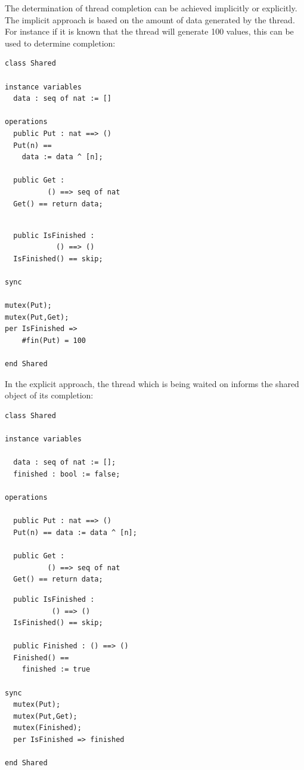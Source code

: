 \documentclass{overturerepchap}
\begin{document}
The determination of thread completion can be achieved implicitly or
explicitly. The implicit approach is based on the amount of data
generated by the thread. For instance if it is known that the thread
will generate 100 values, this can be used to determine completion:

\begin{multicols}{2}
\begin{lstlisting}
class Shared

instance variables
  data : seq of nat := []

operations
  public Put : nat ==> ()
  Put(n) ==
    data := data ^ [n];

  public Get :
          () ==> seq of nat
  Get() == return data;
\end{lstlisting}
\begin{lstlisting}

  public IsFinished :
            () ==> ()
  IsFinished() == skip;

sync

mutex(Put);
mutex(Put,Get);
per IsFinished =>
    #fin(Put) = 100

end Shared
\end{lstlisting}
\end{multicols}

In the explicit approach, the thread which is being waited on informs
the shared object of its completion:

\begin{multicols}{2}
\begin{lstlisting}
class Shared

instance variables

  data : seq of nat := [];
  finished : bool := false;

operations

  public Put : nat ==> ()
  Put(n) == data := data ^ [n];

  public Get :
          () ==> seq of nat
  Get() == return data;

\end{lstlisting}
\begin{lstlisting}
  public IsFinished :
           () ==> ()
  IsFinished() == skip;

  public Finished : () ==> ()
  Finished() ==
    finished := true

sync
  mutex(Put);
  mutex(Put,Get);
  mutex(Finished);
  per IsFinished => finished

end Shared
\end{lstlisting}
\end{multicols}
\end{document}
